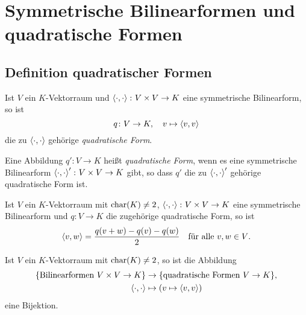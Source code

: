 \section{Symmetrische Bilinearformen und quadratische Formen}










\subsection{Definition quadratischer Formen}


\begin{definition}
  Ist $V$ ein $K$-Vektorraum und $\left\langle \cdot, \cdot \right\rangle \colon V \times V \to K$ eine symmetrische Bilinearform, so ist
  \[
    q \colon V \to K,
    \quad
    v \mapsto \left\langle v, v \right\rangle
  \]
  die zu $\left\langle \cdot, \cdot \right\rangle$ gehörige \emph{quadratische Form}.
  
  Eine Abbildung $q' \colon V \to K$ heißt \emph{quadratische Form}, wenn es eine symmetrische Bilinearform $\left\langle \cdot, \cdot \right\rangle' \colon V \times V \to K$ gibt, so dass $q'$ die zu $\left\langle \cdot, \cdot \right\rangle'$ gehörige quadratische Form ist.
\end{definition}


\begin{lemma}
  Ist $V$ ein $K$-Vektorraum mit $\operatorname{char}(K) \neq 2$, $\left\langle \cdot, \cdot \right\rangle \colon V \times V \to K$ eine symmetrische Bilinearform und $q \colon V \to K$ die zugehörige quadratische Form, so ist
  \[
    \left\langle v, w \right\rangle = \frac{q(v+w)-q(v)-q(w)}{2}
    \quad
    \text{für alle $v, w \in V$}.
  \]
\end{lemma}


\begin{corollary}
  Ist $V$ ein $K$-Vektorraum mit $\operatorname{char}(K) \neq 2$, so ist die Abbildung
  \begin{align*}
    \{ \text{Bilinearformen $V \times V \to K$} \}
    &\to
    \{ \text{quadratische Formen $V \to K$} \},
    \\
    \left\langle \cdot, \cdot \right\rangle
    &\mapsto
    (v \mapsto \left\langle v,v \right\rangle)
  \end{align*}
  eine Bijektion.
\end{corollary}


